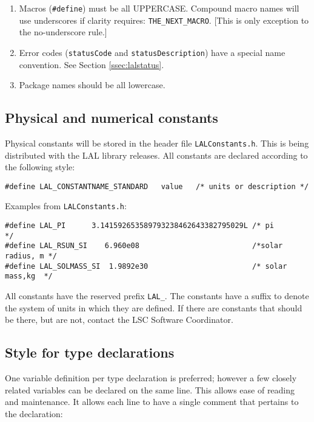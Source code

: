 \documentclass[]{ligodcc}
\begin{document}
\begin{enumerate}
\item
Macros ({\tt \#define})  must be all UPPERCASE. Compound macro names
will use underscores if clarity requires: {\tt THE\_NEXT\_MACRO}. [This is
only exception to the no-underscore rule.]


\item
Error codes ({\tt statusCode} and {\tt statusDescription}) have a special
name convention. See Section \ref{ssec:lalstatus}.

\item
Package names should be all lowercase.

\end{enumerate}


\subsection{Physical and numerical constants}

Physical constants will be stored in the header file {\tt LALConstants.h}.
This is being distributed with the LAL library releases. All constants
are declared according to the following style:
{\footnotesize
\begin{verbatim}
#define LAL_CONSTANTNAME_STANDARD   value   /* units or description */
\end{verbatim}}

\noindent
Examples from {\tt LALConstants.h}:

{\footnotesize
\begin{verbatim}
#define LAL_PI      3.141592653589793238462643382795029L /* pi             */
#define LAL_RSUN_SI    6.960e08                          /*solar radius, m */
#define LAL_SOLMASS_SI  1.9892e30                        /* solar mass,kg  */
\end{verbatim}}

All constants have the reserved prefix {\tt LAL\_}. The constants have a
suffix to denote the system of units in which they are defined. If
there are constants that should be there, but are not, contact the LSC
Software Coordinator.

\subsection{Style for type declarations}

One variable definition per type declaration is preferred; however a
few closely related variables can be declared on the same line. This
allows ease of reading and maintenance. It allows each line to have a
single comment that pertains to the declaration:
\end{document}
